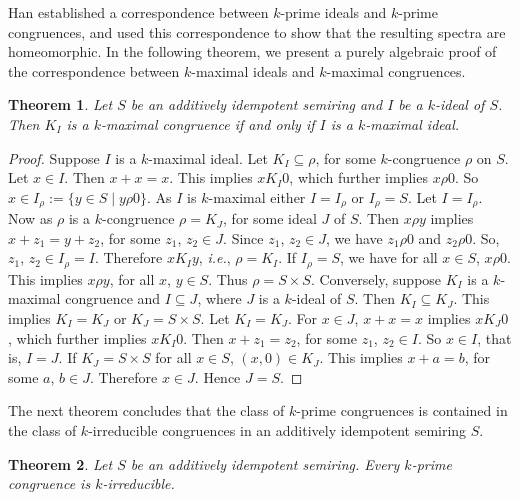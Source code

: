 \documentclass[11pt,english]{amsart}
\newtheorem{theorem}{Theorem}[section]
\theoremstyle{definition}
\numberwithin{equation}{section}
\begin{document}
 Han \cite[Theorem 5.4]{Han21} established a correspondence between $k$-prime ideals and $k$-prime congruences, and used this correspondence to show that the resulting spectra are homeomorphic. In the following theorem, we present a purely algebraic proof of the correspondence between $k$-maximal ideals and $k$-maximal congruences. 
 \begin{theorem}
 	
     Let $S$ be an additively idempotent semiring and $I$ be a $k$-ideal of $S$. Then $K_I$ is a $k$-maximal congruence if and only if $I$ is a $k$-maximal ideal.
 \end{theorem}
 
 \begin{proof}
     Suppose $I$ is a $k$-maximal ideal. Let $K_I\subseteq \rho$, for some $k$-congruence $\rho$ on $S$. Let $x\in I$. Then $x+x=x$. This implies $xK_I0$, which further implies $x\rho0$. So $x\in I_\rho :=\{y\in S\mid y\rho0\}$. As $I$ is $k$-maximal either $I=I_\rho$ or $I_\rho=S$. Let $I=I_\rho$. Now as $\rho$ is a $k$-congruence $\rho=K_J$, for some ideal $J$ of $S$. Then $x\rho y$ implies $x+z_1=y+z_2$, for some $z_1$, $z_2\in J$. Since $z_1$, $z_2\in J$, we have $z_1\rho0$ and $z_2\rho0$. So, $z_1$, $z_2\in I_\rho=I$. Therefore $xK_Iy$, \textit{i.e.}, $\rho=K_I$. If $I_\rho=S$, we have for all $x\in S$, $x\rho0$. This implies $x\rho y$, for all $x$, $y\in S$. Thus $\rho=S\times S$.
Conversely, suppose $K_I$ is a $k$-maximal congruence and $I\subseteq J$, where $J$ is a $k$-ideal of $S$. Then $K_I\subseteq K_J$. This implies $K_I=K_J$ or $K_J=S\times S$. Let $K_I=K_J$. For $x\in J$, $x+x=x$ implies $xK_J0$, which further implies $xK_I0$. Then $x+z_1=z_2$, for some $z_1$, $z_2\in I$. So $x\in I$, that is, $I=J$. If $K_J=S\times S$ for all $x\in S$, $(x,0)\in K_J$. This implies $x+a=b$, for some $a$, $b\in J$. Therefore $x\in J$. Hence $J=S$.
 \end{proof}
 The next theorem concludes that the class of $k$-prime congruences is contained in the class of $k$-irreducible congruences in an additively idempotent semiring $S$. 
 
 \begin{theorem}
    Let $S$ be an additively idempotent semiring. Every $k$-prime congruence is $k$-irreducible.
 \end{theorem}
 
\end{document}
